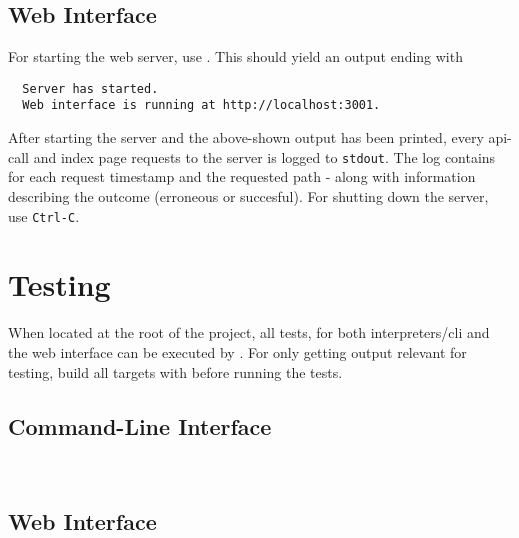 \subsection*{Web Interface}
%

For starting the web server, use . This should yield an output ending with
\begin{lstlisting}
  Server has started.
  Web interface is running at http://localhost:3001.
\end{lstlisting}

After starting the server and the above-shown output has been printed, every api-call and index page requests to the server is logged to \texttt{stdout}.
The log contains for each request timestamp and the requested path - along with information describing the outcome (erroneous or succesful).
For shutting down the server, use \texttt{Ctrl-C}.


\section*{Testing}

When located at the root of the project, all tests, for both interpreters/cli and the web interface can be executed by . For only getting output relevant for testing, build all targets with  before running the tests.

\subsection*{Command-Line Interface}
\\

\subsection*{Web Interface}
\\
\\

